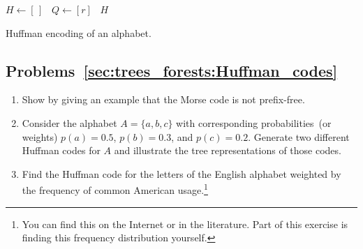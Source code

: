 \begin{algorithm}[!htpb]
\dontprintsemicolon  %
\BlankLine
$H \leftarrow [\,]$~\;
$Q \leftarrow [r]$~\;
\Return $H$\;
\caption{Huffman encoding of an alphabet.}
\label{alg:trees_forests:Huffman_encoding_alphabet}
\end{algorithm}



\subsection*{Problems~\ref{sec:trees_forests:Huffman_codes}}

\begin{enumerate}
\item Show by giving an example that the Morse code is not
  prefix-free.

\item Consider the alphabet $A = \{a,b,c\}$ with corresponding
  probabilities~(or weights) $p(a) = 0.5$, $p(b) = 0.3$, and
  $p(c) = 0.2$. Generate two different Huffman codes for $A$ and
  illustrate the tree representations of those codes.

\item Find the Huffman code for the letters of the English alphabet
  weighted by the frequency of common American usage.\footnote{
    You can find this on the Internet or in the literature. Part of
    this exercise is finding this frequency distribution yourself.}
\end{enumerate}


